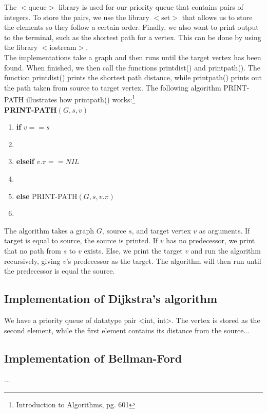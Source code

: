 \documentclass[11pt]{article}
\begin{document}
\noindent The $<$queue$>$ library is used for our priority queue that contains pairs of integers. To store the pairs, we use the library $<$set$>$ that allows us to store the elements so they follow a certain order. Finally, we also want to print output to the terminal, such as the shortest path for a vertex. This can be done by using the library $<$iostream$>$.\\

\noindent The implementations take a graph and then runs until the target vertex has been found. When finished, we then call the functions print\textunderscore dist() and print\textunderscore path(). The function print\textunderscore dist() prints the shortest path distance, while print\textunderscore path() prints out the path taken from source to target vertex. The following algorithm PRINT-PATH illustrates how print\textunderscore path() works:\footnote{Introduction to Algorithms, pg. 601}\\ 

\textbf{PRINT-PATH$(G, s, v)$}
\begin{enumerate}
\setlength\itemsep{0em}
\item \textbf{if }$v == s$
\item {}
\item \textbf{elseif }$v.\pi == NIL$
\item {}
\item \textbf{else } PRINT-PATH$(G, s, v.\pi)$
\item {}
\end{enumerate}

\noindent The algorithm takes a graph $G$, source $s$, and target vertex $v$ as arguments. If target is equal to source, the source is printed. If $v$ has no predecessor, we print that no path from $s$ to $v$ exists. Else, we print the target $v$ and run the algorithm recursively, giving $v$'s predecessor as the target. The algorithm will then run until the predecessor is equal the source.\\

\subsection{Implementation of Dijkstra's algorithm}
We have a priority queue of datatype pair <int, int>. The vertex is stored as the second element, while the first element contains its distance from the source...


\subsection{Implementation of Bellman-Ford}
...
\end{document}
